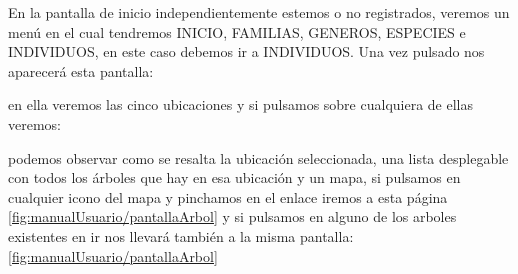 En la pantalla de inicio independientemente estemos o no registrados, veremos un menú en el cual tendremos INICIO, FAMILIAS, GENEROS, ESPECIES e INDIVIDUOS, en este caso debemos ir a INDIVIDUOS. Una vez pulsado nos aparecerá esta pantalla: 

en ella veremos las cinco ubicaciones y si pulsamos sobre cualquiera de ellas veremos:  

podemos observar como se resalta la ubicación seleccionada, una lista desplegable con todos los árboles que hay en esa ubicación y un mapa, si pulsamos en cualquier icono del mapa y pinchamos en el enlace iremos a esta página \ref{fig:manualUsuario/pantallaArbol} y si pulsamos en alguno de los arboles existentes en ir nos llevará también a la  misma pantalla: \ref{fig:manualUsuario/pantallaArbol}